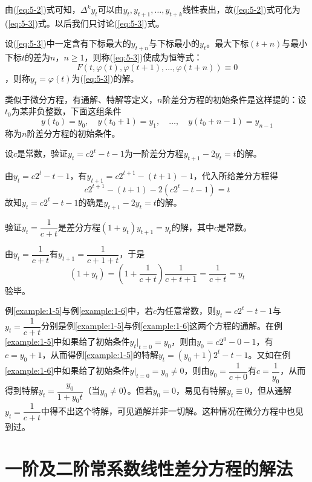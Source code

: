 		由(\ref{eq:5-2})式可知，$\Delta ^ k y_t$可以由$y_t,y_{t + 1}, \ldots, y_{t + k}$线性表出，故(\ref{eq:5-2})式可化为(\ref{eq:5-3})式。以后我们只讨论(\ref{eq:5-3})式。

		设(\ref{eq:5-3})中一定含有下标最大的$y_{t + n}$与下标最小的$y_t$。最大下标$(t + n)$与最小下标$t$的差为$n$，$n \geqslant 1$，则称(\ref{eq:5-3})使成为恒等式：$$ F(t, \varphi(t), \varphi(t + 1), \ldots, \varphi(t + n)) \equiv 0 $$，则称$y_t = \varphi (t)$为(\ref{eq:5-3})的{\heiti 解}。

		 类似于微分方程，有通解、特解等定义，$n$阶差分方程的初始条件是这样提的：设$t_0$为某非负整数，下面这组条件
		\begin{equation}
			y(t_0) = y_0, \quad y(t_0 + 1) = y_1, \quad\ldots, \quad y (t_0 + n -1) = y_{n - 1}
		\end{equation}
		称为$n$阶差分方程的{\heiti 初始条件}。

		\example\label{example:1-5} 设$c$是常数，验证$y_t = c2^t - t - 1$为一阶差分方程$y_{t + 1} - 2y_t = t$的解。

		\answer 由$y_t = c2^t - t- 1$，有$y_{t + 1} = c2^{t + 1} - (t + 1) -1$，代入所给差分方程得$$c2^{t + 1} - (t + 1) - 2(c2^t - t - 1) = t$$故知$y_t = c2^t - t - 1$的确是$y_{t + 1} - 2y_t = t$的解。

		\example\label{example:1-6} 验证$y_t = \dfrac{1}{c + t}$是差分方程$(1 + y_t)y_{t + 1} = y_t$的解，其中$c$是常数。

		\answer 由$y_t = \dfrac{1}{c + t }$有$y_{t + 1} = \dfrac{1}{c + 1 + t}$，于是$$(1 + y_t) = \left(1 + \frac{1}{c + t} \right) \frac{1}{c + t +1} = \frac{1}{c + t} = y_t$$验毕。

		\remark 例\ref{example:1-5}与例\ref{example:1-6}中，若$c$为任意常数，则$y_t = c2^t - t - 1$与$y_t = \dfrac{1}{c + t}$分别是例\ref{example:1-5}与例\ref{example:1-6}这两个方程的通解。在例\ref{example:1-5}中如果给了初始条件$y_t \vert _{t=0} = y_0$，则由$y_0 = c2^0 - 0 - 1$，有$c = y_0 + 1$，从而得例\ref{example:1-5}的特解$y_t = (y_0 + 1) 2^t -t - 1$。又如在例\ref{example:1-6}中如果给了初始条件$y  \vert _{t=0} = y_0 \neq 0$，则由$y_0 = \dfrac{1}{c + 0}$有$c = \dfrac{1}{y_0}$，从而得到特解$y_t = \dfrac{y_0}{1 + y_0t}$（当$y_0 \neq 0$）。但若$y_0 = 0$，易见有特解$y_t \equiv 0$，但从通解$y_t = \dfrac{1}{c + t}$中得不出这个特解，可见通解并非一切解。这种情况在微分方程中也见到过。

	\section{一阶及二阶常系数线性差分方程的解法}

